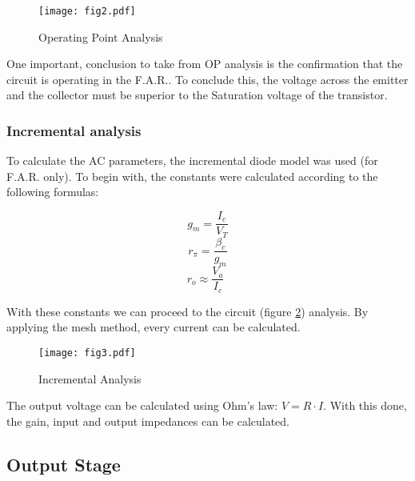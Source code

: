 \begin{figure}[h!]
    \centering
    \texttt{[image: fig2.pdf]}
    \caption{Operating Point Analysis}
    \label{fig:OP_Analysis}
\end{figure}

One important, conclusion to take from OP analysis is the confirmation that the circuit is operating in the F.A.R.. To conclude this, the voltage across the emitter and the collector must be superior to the Saturation voltage of the transistor.

\subsubsection*{Incremental analysis}

\indent

To calculate the AC parameters, the incremental diode model was used (for F.A.R. only). To begin with, the constants were calculated according to the following formulas:

\begin{equation}
    g_m= \frac{I_c}{V_T}
\end{equation}
\begin{equation}
    r_{\pi}=\frac{\beta_c}{g_m}
\end{equation}
\begin{equation}
    r_o \approx \frac{V_a}{I_c} \hspace{5pt}
\end{equation}

With these constants we can proceed to the circuit (figure \ref{fig:AC_Analysis}) analysis. By applying the mesh method, every current can be calculated.


\begin{figure}[h!]
    \centering
    \texttt{[image: fig3.pdf]}
    \caption{Incremental Analysis}
    \label{fig:AC_Analysis}
\end{figure}

The output voltage can be calculated using Ohm's law: $V= R \cdot I$. With this done, the gain, input and output impedances can be calculated.

\subsection{Output Stage}

\indent

